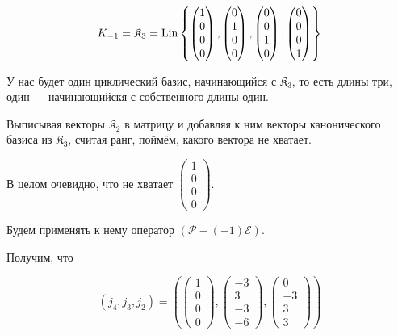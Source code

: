 \documentclass[12pt, a4paper]{article}
\begin{document}
    \begin{equation}
        K_{-1} = \mathfrak{K}_3 = \operatorname{Lin} \left\{ \begin{pmatrix} 1\\0\\0\\0 \end{pmatrix}, \begin{pmatrix} 0\\1\\0\\0 \end{pmatrix}, \begin{pmatrix} 0\\0\\1\\0 \end{pmatrix}, \begin{pmatrix} 0\\0\\0\\1 \end{pmatrix}  \right\}
    \end{equation}
    
    У нас будет один циклический базис, начинающийся с $\mathfrak{K}_3$, то есть длины три, один — начинающийскя с собственного длины один.

    Выписывая векторы $\mathfrak{K}_2$ в матрицу и добавляя к ним векторы канонического базиса из $\mathfrak{K}_3$, считая ранг, поймём, какого вектора не хватает.

    В целом очевидно, что не хватает $\begin{pmatrix} 1\\0\\0\\0 \end{pmatrix}$.

    Будем применять к нему оператор $(\mathcal{P} - (-1) \mathcal{E})$.

    Получим, что 

    \begin{equation}
        (j_4, j_3, j_2) = \left( \begin{pmatrix} 1\\0\\0\\0 \end{pmatrix}, \left(\begin{matrix}
            -3 \\
            3 \\
            -3 \\
            -6
        \end{matrix}\right), \left(\begin{matrix}
            0 \\
            -3 \\
            3 \\
            3
        \end{matrix}\right) \right)
    \end{equation}
\end{document}
